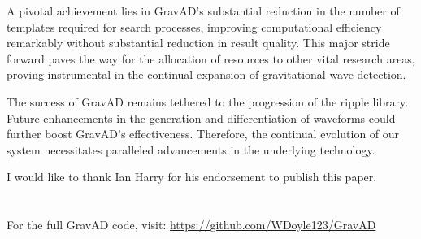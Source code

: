 \documentclass[twocolumn, aps, pra]{revtex4-2}
\begin{document}
	A pivotal achievement lies in GravAD's substantial reduction in the number of templates required for search processes, improving computational efficiency remarkably without substantial reduction in result quality. This major stride forward paves the way for the allocation of resources to other vital research areas, proving instrumental in the continual expansion of gravitational wave detection.
	
	The success of GravAD remains tethered to the progression of the ripple library. Future enhancements in the generation and differentiation of waveforms could further boost GravAD's effectiveness. Therefore, the continual evolution of our system necessitates paralleled advancements in the underlying technology.
	

	\begin{acknowledgments}
		I would like to thank Ian Harry for his endorsement to publish this paper.
	\end{acknowledgments}
	
	
	\appendix
	\section{}
	For the full GravAD code, visit: \url{https://github.com/WDoyle123/GravAD}
	
\end{document}
